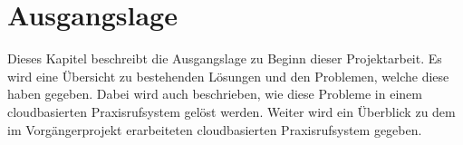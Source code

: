 \section{Ausgangslage}

Dieses Kapitel beschreibt die Ausgangslage zu Beginn dieser Projektarbeit.
Es wird eine Übersicht zu bestehenden Lösungen und den Problemen, welche diese haben gegeben.
Dabei wird auch beschrieben, wie diese Probleme in einem cloudbasierten Praxisrufsystem gelöst werden.
Weiter wird ein Überblick zu dem im Vorgängerprojekt erarbeiteten cloudbasierten Praxisrufsystem gegeben.





%
%
%
%
%
%
%
%
%
%
%

\clearpage

